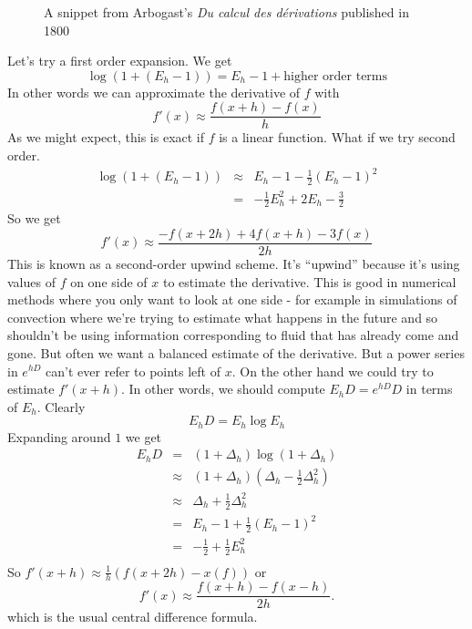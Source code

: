 \documentclass[a4paper]{article}
\theoremstyle{definition}
\begin{document}
\begin{figure}
\centering
{}
\caption{A snippet from Arbogast's \emph{Du calcul des d\'{e}rivations} published in 1800}
\end{figure}

Let's try a first order expansion.
We get
\[
\log(1+(E_h-1)) = E_h-1 + \mbox{higher order terms} 
\]
In other words we can approximate the derivative of $f$ with
\[
f'(x) \approx \frac{f(x+h)-f(x)}{h}
\]
As we might expect, this is exact if $f$ is a linear function.
What if we try second order.
\begin{eqnarray*}
\log(1+(E_h-1)) & \approx  & E_h-1 - \frac{1}{2}(E_h-1)^2 \\
& = & -\frac{1}{2}E_h^2+2E_h-\frac{3}{2}
\end{eqnarray*}
So we get
\[
f'(x) \approx \frac{-f(x+2h)+4f(x+h)-3f(x)}{2h}
\]
This is known as a second-order upwind scheme.
It's ``upwind'' because it's using values of $f$ on one side of $x$ to estimate the derivative.
This is good in numerical methods where you only want to look at one side - for example in simulations of convection where we're trying to estimate what happens in the future and so shouldn't be using information corresponding to fluid that has already come and gone.
But often we want a balanced estimate of the derivative.
But a power series in $e^{hD}$ can't ever refer to points left of $x$.
On the other hand we could try to estimate $f'(x+h)$.
In other words, we should compute $E_hD=e^{hD}D$ in terms of $E_h$.
Clearly
\[
E_hD = E_h\log E_h
\]
Expanding around $1$ we get
\begin{eqnarray*}
E_hD & = & (1+\Delta_h)\log(1+\Delta_h) \\
& \approx & (1+\Delta_h)(\Delta_h-\frac{1}{2}\Delta_h^2) \\
& \approx & \Delta_h+\frac{1}{2}\Delta_h^2 \\
& = & E_h-1+\frac{1}{2}(E_h-1)^2 \\
& = & -\frac{1}{2}+\frac{1}{2}E_h^2\\
\end{eqnarray*}
So $f'(x+h) \approx \frac{1}{h}(f(x+2h)-x(f))$ or
\[
f'(x) \approx \frac{f(x+h)-f(x-h)}{2h}.
\]
which is the usual central difference formula.
\end{document}
